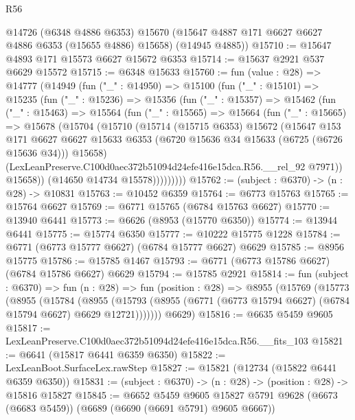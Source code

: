 \begin{lexlean}{R56}
\begin{coremodule}
      @14726
      (@6348 @4886 @6353)
      @15670
      (@15647 @4887 @171 @6627 @6627 @4886 @6353 (@15655 @4886) @15658)
      (@14945 @4885))
@15710 := @15647 @4893 @171 @15573 @6627 @15672 @6353
@15714 := @15637 @2921 @537 @6629 @15572
@15715 := @6348 @15633
@15760 := fun (value : @28) =>
  @14777
    (@14949
      (fun ("_" : @14950) =>
      @15100
        (fun ("_" : @15101) =>
        @15235
          (fun ("_" : @15236) =>
          @15356
            (fun ("_" : @15357) =>
            @15462
              (fun ("_" : @15463) =>
              @15564
                (fun ("_" : @15565) =>
                @15664
                  (fun ("_" : @15665) =>
                  @15678
                    (@15704
                      (@15710
                        (@15714
                          (@15715 @6353)
                          @15672
                          (@15647
                            @153
                            @171
                            @6627
                            @6627
                            @15633
                            @6353
                            (@6720 @15636 @34 @15633 (@6725 (@6726 @15636 @34)))
                            @15658)
                          (LexLeanPreserve.C100d0aec372b51094d24efe416e15dca.R56.__rel_92 @7971))
                        @15658))
                    (@14650 @14734 @15578)))))))))
@15762 := (subject : @6370) -> (n : @28) -> @10831
@15763 := @10452 @6359
@15764 := @6773 @15763
@15765 := @15764 @6627
@15769 := @6771 @15765 (@6784 @15763 @6627)
@15770 := @13940 @6441
@15773 := @6626 (@8953 (@15770 @6350))
@15774 := @13944 @6441
@15775 := @15774 @6350
@15777 := @10222 @15775 @1228
@15784 := @6771 (@6773 @15777 @6627) (@6784 @15777 @6627) @6629
@15785 := @8956 @15775
@15786 := @15785 @1467
@15793 := @6771 (@6773 @15786 @6627) (@6784 @15786 @6627) @6629
@15794 := @15785 @2921
@15814 := fun (subject : @6370) =>
  fun (n : @28) =>
  fun (position : @28) =>
  @8955
    (@15769
      (@15773
        (@8955
          (@15784
            (@8955
              (@15793 (@8955 (@6771 (@6773 @15794 @6627) (@6784 @15794 @6627) @6629 @12721)))))))
      @6629)
@15816 := @6635 @5459 @9605
@15817 := LexLeanPreserve.C100d0aec372b51094d24efe416e15dca.R56.__fits_103
@15821 := @6641 (@15817 @6441 @6359 @6350)
@15822 := LexLeanBoot.SurfaceLex.rawStep
@15827 := @15821 (@12734 (@15822 @6441 @6359 @6350))
@15831 := (subject : @6370) -> (n : @28) -> (position : @28) -> @15816 @15827
@15845 := @6652
    @5459
    @9605
    @15827
    @5791
    @9628
    (@6673 (@6683 @5459))
    (@6689 (@6690 (@6691 @5791) @9605 @6667))

\end{coremodule}
\end{lexlean}
